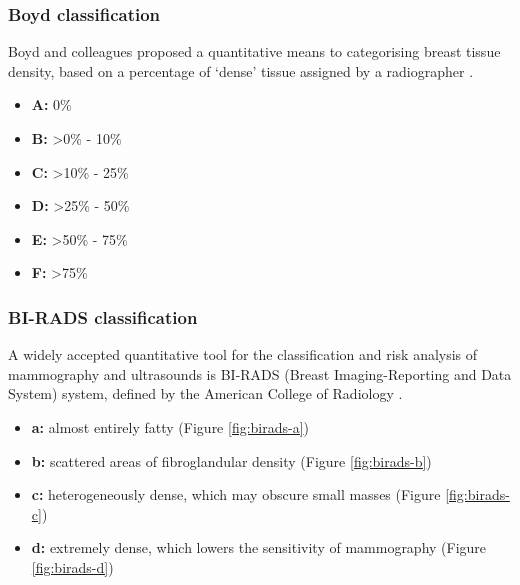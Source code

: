 \subsubsection{Boyd classification}

Boyd and colleagues proposed a quantitative means to categorising breast tissue density, based on a percentage of `dense' tissue assigned by a radiographer \cite{Boyd_Byng_Jong_Fishell_Little_Miller_Lockwood_Tritchler_Yaffe_1995}.

\begin{itemize}
  \item \textbf{A: } 0\%
  \item \textbf{B: } \textgreater 0\% - 10\%
  \item \textbf{C: } \textgreater 10\% - 25\%
  \item \textbf{D: } \textgreater 25\% - 50\%
  \item \textbf{E: } \textgreater 50\% - 75\%
  \item \textbf{F: } \textgreater 75\%
\end{itemize}

\subsubsection{BI-RADS classification}
\label{sssec:bi-rads}

A widely accepted quantitative tool for the classification and risk analysis of mammography and ultrasounds is BI-RADS (Breast Imaging-Reporting and Data System) system, defined by the American College of Radiology \cite{sickles2013acr}.

\begin{itemize}
  \item \textbf{a: } almost entirely fatty (Figure \ref{fig:birads-a})
  \item \textbf{b: } scattered areas of fibroglandular density (Figure \ref{fig:birads-b})
  \item \textbf{c: } heterogeneously dense, which may obscure small masses (Figure \ref{fig:birads-c})
  \item \textbf{d: } extremely dense, which lowers the sensitivity of mammography (Figure \ref{fig:birads-d})
\end{itemize}

